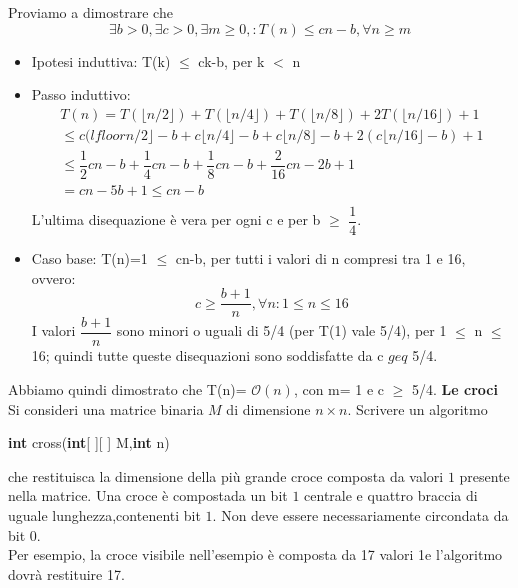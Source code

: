 \documentclass[../cheatSheetAlgoritmi.tex]{subfiles}
\begin{document}
Proviamo a dimostrare che 
\begin{equation*}
  \exists b \text{$>$} 0, \exists c \text{$>$} 0, \exists m \text{$\geq$} 0, : T(n) \text{$\leq$} cn-b, \forall n \text{$\geq$} m
\end{equation*}
\begin{itemize}
	\item Ipotesi induttiva: T(k) $\leq$ ck-b, per k $<$ n
	\item Passo induttivo:
	\begin{equation*}
		\begin{aligned}	
			T(n)= T(\lfloor n/2 \rfloor) + T(\lfloor n/4 \rfloor)+ T(\lfloor n/8 \rfloor)+ 2T(\lfloor n/16 \rfloor) + 1\\
			\text{$\leq$} c(lfloor n/2 \rfloor -b + c\lfloor n/4 \rfloor -b+ c\lfloor n/8 \rfloor -b + 2(c \lfloor n/16 \rfloor -b) + 1\\ 
			\text{$\leq$}  \dfrac{1}{2}cn -b + \dfrac{1}{4}cn -b + \dfrac{1}{8}cn -b + \dfrac{2}{16}cn -2b + 1\\
=  cn -5b + 1 \text{$\leq$} cn -b \\
		\end{aligned}
	\end{equation*}
	L'ultima disequazione è vera per ogni c e per b $\geq$ $\dfrac{1}{4}$. 
	\item Caso base: T(n)=1 $\leq$ cn-b, per tutti i valori di n compresi tra 1 e 16, ovvero: 
	\begin{equation*}
		c \text{$\geq$} \dfrac{b+1}{n}, \forall n: 	\text{$1 \leq n \leq 16$}
	\end{equation*}
	I valori $\dfrac{b+1}{n}$ sono minori o uguali di 5/4 (per T(1) vale 5/4), per 1 $\leq$ n $\leq$ 16; quindi tutte queste disequazioni sono soddisfatte da c $geq$ 5/4. 
\end{itemize}
Abbiamo quindi dimostrato che T(n)= $\mathcal{O}(n)$, con m= 1 e c $\geq$ 5/4.
\newpage 
\textbf{Le croci}  \\
Si consideri una matrice binaria $M$ di dimensione $n \times n$. Scrivere un algoritmo
\begin{center}
\textbf{int} cross(\textbf{int}[ ][ ] M,\textbf{int} n)
\end{center}
che restituisca la dimensione della più grande croce composta da valori $1$ presente nella matrice. Una croce è compostada un bit $1$ centrale e quattro braccia di uguale lunghezza,contenenti bit $1$. Non deve essere necessariamente circondata da bit $0$. \\
Per esempio, la croce visibile nell’esempio è composta da 17 valori 1e l’algoritmo dovrà restituire 17.
\end{document}
